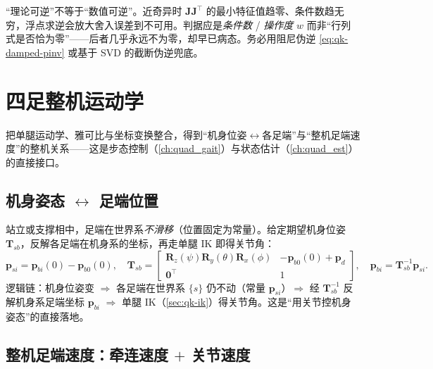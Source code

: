 \begin{pitfall}
“理论可逆”不等于“数值可逆”。近奇异时 $\mathbf{J}\mathbf{J}^\top$ 的最小特征值趋零、条件数趋无穷，浮点求逆会放大舍入误差到不可用。判据应是\emph{条件数} / \emph{操作度} $w$ 而非“行列式是否恰为零”——后者几乎永远不为零，却早已病态。务必用阻尼伪逆 \cref{eq:qk-damped-pinv} 或基于 SVD 的截断伪逆兜底。
\end{pitfall}

\section{四足整机运动学}
\label{sec:qk-wholebody}

把单腿运动学、雅可比与坐标变换整合，得到“机身位姿$\leftrightarrow$各足端”与“整机足端速度”的整机关系——这是步态控制（\cref{ch:quad_gait}）与状态估计（\cref{ch:quad_est}）的直接接口。

\subsection{机身姿态 \texorpdfstring{$\leftrightarrow$}{<->} 足端位置}
\label{subsec:qk-body-foot}

站立或支撑相中，足端在世界系\emph{不滑移}（位置固定为常量）。给定期望机身位姿 $\mathbf{T}_{sb}$，反解各足端在机身系的坐标，再走单腿 IK 即得关节角\cite{unitree2023quadruped}：
\begin{equation}
  \boldsymbol{p}_{si}=\boldsymbol{p}_{bi}(0)-\boldsymbol{p}_{b0}(0),
  \quad
  \mathbf{T}_{sb}=\begin{bmatrix}\mathbf{R}_z(\psi)\mathbf{R}_y(\theta)\mathbf{R}_x(\phi)&-\boldsymbol{p}_{b0}(0)+\boldsymbol{p}_d\\\mathbf{0}^\top&1\end{bmatrix},
  \quad
  \boldsymbol{p}_{bi}=\mathbf{T}_{sb}^{-1}\boldsymbol{p}_{si}.
  \label{eq:qk-body-foot}
\end{equation}
逻辑链：机身位姿变 $\Rightarrow$ 各足端在世界系 $\{s\}$ 仍不动（常量 $\boldsymbol{p}_{si}$）$\Rightarrow$ 经 $\mathbf{T}_{sb}^{-1}$ 反解机身系足端坐标 $\boldsymbol{p}_{bi}$ $\Rightarrow$ 单腿 IK（\cref{sec:qk-ik}）得关节角。这是“用关节控机身姿态”的直接落地。

\subsection{整机足端速度：牵连速度 \texorpdfstring{$+$}{+} 关节速度}
\label{subsec:qk-foot-vel}

